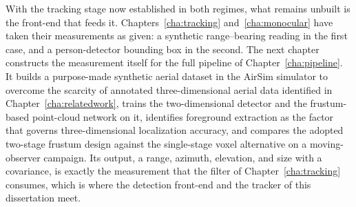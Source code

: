 With the tracking stage now established in both regimes, what remains unbuilt is
the front-end that feeds it. Chapters~\ref{cha:tracking} and~\ref{cha:monocular}
have taken their measurements as given: a synthetic range--bearing reading in the
first case, and a person-detector bounding box in the second. The next chapter
constructs the measurement itself for the full pipeline of
Chapter~\ref{cha:pipeline}. It builds a purpose-made synthetic aerial dataset in
the AirSim simulator to overcome the scarcity of annotated three-dimensional
aerial data identified in Chapter~\ref{cha:relatedwork}, trains the
two-dimensional detector and the frustum-based point-cloud network on it,
identifies foreground extraction as the factor that governs three-dimensional
localization accuracy, and compares the adopted two-stage frustum design against
the single-stage voxel alternative on a moving-observer campaign. Its output, a
range, azimuth, elevation, and size with a covariance, is exactly the measurement
that the filter of Chapter~\ref{cha:tracking} consumes, which is where the
detection front-end and the tracker of this dissertation meet.
